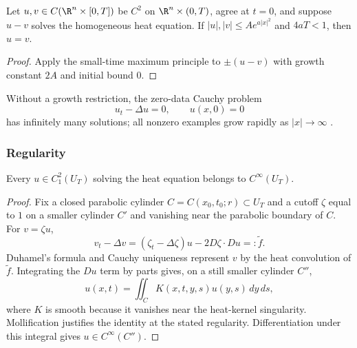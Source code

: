 \begin{theorem}
\label{thm:uniqueness-heat-cauchy-problem-smalltime}
\leanok
Let $u,v\in C(\R^n\times[0,T])$ be $C^2$ on $\R^n\times(0,T)$, agree at
$t=0$, and suppose $u-v$ solves the homogeneous heat equation. If
$|u|,|v|\le Ae^{a|x|^2}$ and $4aT<1$, then $u=v$.
\end{theorem}
\begin{proof}
\sketch Apply the small-time maximum principle to $\pm(u-v)$ with growth
constant $2A$ and initial bound $0$.
\end{proof}

\begin{remark}
\label{rem:heat-equation-nonphysical-solutions}
Without a growth restriction, the zero-data Cauchy problem
$$u_t-\Delta u=0,
\qquad
u(x,0)=0$$
has infinitely many solutions; all nonzero examples grow rapidly as
$|x|\to\infty$ \cite{John1982}.
\end{remark}

\subsubsection{Regularity}
\label{sec:heat-regularity}

\begin{theorem}[Smoothness]
\label{thm:heat-equation-smoothness}
Every $u\in C_1^2(U_T)$ solving the heat equation belongs to
$C^\infty(U_T)$.
\end{theorem}
\begin{proof}
\sketch Fix a closed parabolic cylinder $C=C(x_0,t_0;r)\subset U_T$ and a
cutoff $\zeta$ equal to $1$ on a smaller cylinder $C'$ and vanishing near the
parabolic boundary of $C$. For $v=\zeta u$,
$$v_t-\Delta v=(\zeta_t-\Delta\zeta)u-2D\zeta\cdot Du=:\widetilde f.$$
Duhamel's formula and Cauchy uniqueness represent $v$ by the heat convolution
of $\widetilde f$. Integrating the $Du$ term by parts gives, on a still smaller
cylinder $C''$,
$$u(x,t)=\iint_CK(x,t,y,s)u(y,s)\,dy\,ds,$$
where $K$ is smooth because it vanishes near the heat-kernel singularity.
Mollification justifies the identity at the stated regularity. Differentiation
under this integral gives $u\in C^\infty(C'')$.
\end{proof}

